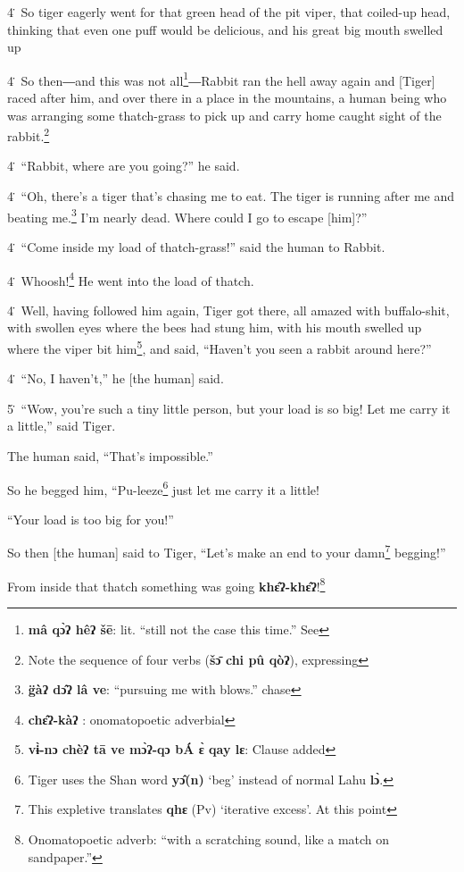 {4\. So tiger eagerly went for that green head of the pit viper, that coiled-up
head, thinking that even one puff would be delicious, and his great big mouth swelled
up

4\. So then―and this was not all\footnote{\textbf{mâ qɔ̀ʔ hêʔ šē}: lit. ``still not the case this time.'' See}―Rabbit ran the hell away again and [Tiger]
raced after him, and over there in a place in the mountains, a human being who
was arranging some thatch-grass to pick up and carry home caught sight of the rabbit.\footnote{Note the sequence of four verbs (\textbf{šɔ̄ chi pû qòʔ}), expressing}

4\. ``Rabbit, where are you going?'' he said.

4\. ``Oh, there's a tiger that's chasing me to eat. The tiger is running after
me and beating me.\footnote{\textbf{ g̈àʔ  dɔ̂ʔ  lâ    ve}: ``pursuing me with blows.'' chase} I'm nearly dead. Where could I go to escape [him]?''

4\. ``Come inside my load of thatch-grass!'' said the human to Rabbit.

4\. Whoosh!\footnote{\textbf{chɛ̂ʔ-kàʔ} : onomatopoetic adverbial} He went into the load of thatch.

4\. Well, having followed him again, Tiger got there, all amazed with buffalo-shit,
with swollen eyes where the bees had stung him, with his mouth swelled up where
the viper bit him\footnote{\textbf{ vɨ̀-nɔ chèʔ tā ve mɔ̀ʔ-qɔ bÁ ɛ̀ qay lɛ}: Clause added}, and said, ``Haven't you seen a rabbit around here?''

4\. ``No, I haven't,'' he [the human] said.

5\. ``Wow, you're such a tiny little person, but your load is so big! Let me carry
it a little,'' said Tiger.

The human said, ``That's impossible.''

So he begged him, ``Pu-leeze\footnote{Tiger uses the Shan word \textbf{yɔ̂(n)} `beg' instead of normal Lahu \textbf{lɔ̀}.} just let me carry it a little!

``Your load is too big for you!''

So then [the human] said to Tiger, ``Let's make an end to your damn\footnote{This expletive translates \textbf{qhɛ} (Pv) `iterative excess'. At this point} begging!''

From inside that thatch something was going \textbf{khɛ̂ʔ-khɛ̂ʔ}!\footnote{Onomatopoetic adverb: ``with a scratching sound, like a match on sandpaper.''}

}
